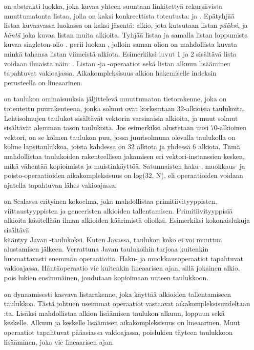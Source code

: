  on abstrakti luokka, joka kuvaa yhteen suuntaan linkitettyä rekursiivista muuttumatonta listaa, jolla on kaksi konkreettista toteutusta:  ja . Epätyhjää listaa kuvaavassa luokassa \code{::} on kaksi jäsentä: alkio, jota kutsutaan listan \textit{pääksi}, ja \textit{häntä} joka kuvaa listan muita alkioita. Tyhjää listaa ja samalla listan loppumista kuvaa singleton-olio .  perii luokan , jolloin saman olion on mahdollista kuvata minkä tahansa listan viimeistä alkiota. Esimerkiksi luvut 1 ja 2 sisältävä lista voidaan ilmaista näin: . Listan -ja -operaatiot sekä listan alkuun lisääminen tapahtuvat vakioajassa. Aikakompleksisuus alkion hakemiselle indeksin perusteella on lineaarinen.
\cite{scalaAPI}
\cite{scalaCollections}

 on taulukon ominaisuuksia jäljittelevä muuttumaton tietorakenne, joka on toteutettu puurakenteena, jonka solmut ovat korkeintaan 32-alkioisia taulukoita. Lehtisolmujen taulukot sisältävät vektorin varsinaisia alkioita, ja muut solmut sisältävät alemman tason taulukoita. Jos esimerkiksi alustetaan uusi 70-alkioinen vektori, on se kolmen taulukon puu, jossa juurisolmuna olevalla taulukolla on kolme lapsitaulukkoa, joista kahdessa on 32 alkiota ja yhdessä 6 alkiota. Tämä mahdollistaa taulukoiden rakenteellisen jakamisen eri vektori-instanssien kesken, mikä vähentää kopioimista ja muistinkäyttöä. Satunnaisten haku-, muokkaus- ja poisto-operaatioiden aikakompleksisuus on log(32, N), eli operaatioiden voidaan ajatella tapahtuvan lähes vakioajassa.
\cite{scalaCollections}
\cite[Luku 4]{highPerformanceProgramming}

 on Scalassa erityinen kokoelma, joka mahdollistaa primitiivityyppisten, viittaustyyppisten ja geneeristen alkioiden tallentamisen. Primitiivityyppisiä alkioita käsitellään ilman alkioiden käärimistä olioiksi. Esimerkiksi kokonaislukuja sisältävä \\ kääntyy Javan -taulukoksi. Kuten Javassa, taulukon koko ei voi muuttua alustamisen jälkeen. Verrattuna Javan taulukoihin  tarjoaa kuitenkin huomattavasti enemmän operaatioita. Haku- ja muokkausoperaatiot tapahtuvat vakioajassa. Häntäoperaatio vie kuitenkin lineaarisen ajan, sillä jokainen alkio, pois lukien ensimmäinen, joudutaan kopioimaan uuteen taulukkoon.
\cite{scalaCollections}

 on dynaamisesti kasvava listarakenne, joka käyttää alkioiden tallentamiseen taulukkoa. Tästä johtuen useimmat operaatiot vastaavat aikakompleksisuudeltaan :ta. Lisäksi  mahdollistaa alkion lisäämisen taulukon alkuun, loppuun sekä keskelle. Alkuun ja keskelle lisäämisen aikakompleksisuus on lineaarinen. Muut operaatiot tapahtuvat pääasiassa vakioajassa, poislukien täyteen taulukkoon lisääminen, joka vie lineaarisen ajan.
\cite{scalaCollections}

